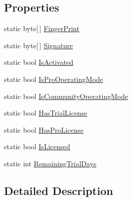 \subsection*{Properties}
\begin{DoxyCompactItemize}
\item 
static byte\mbox{[}$\,$\mbox{]} \hyperlink{classi_c_s___license_controller_aaf6a83d8885786f9bdd0a92e6bd73ca3}{Finger\+Print}
\item 
static byte\mbox{[}$\,$\mbox{]} \hyperlink{classi_c_s___license_controller_a3cea8d28f16e40b0956ea42d865d6621}{Signature}
\item 
static bool \hyperlink{classi_c_s___license_controller_aad3df38dc7ac4c182e24b4b84d1aac85}{Is\+Activated}
\item 
static bool \hyperlink{classi_c_s___license_controller_a789d1c6f639e1fbf58f696446c402c70}{Is\+Pro\+Operating\+Mode}
\item 
static bool \hyperlink{classi_c_s___license_controller_ae135063a15f1f112b3bf19429723ad89}{Is\+Community\+Operating\+Mode}
\item 
static bool \hyperlink{classi_c_s___license_controller_a99af54ac6e40c4780dd1d4e773a7c237}{Has\+Trial\+License}
\item 
static bool \hyperlink{classi_c_s___license_controller_a11ad9bb7ce1860b1a59e24dfd2a907be}{Has\+Pro\+License}
\item 
static bool \hyperlink{classi_c_s___license_controller_a2ca606cc06c0244d43a9b2d17ee0db33}{Is\+Licensed}
\item 
static int \hyperlink{classi_c_s___license_controller_a55ed2f505c86334b4be47d81aca53202}{Remaining\+Trial\+Days}
\end{DoxyCompactItemize}


\subsection{Detailed Description}


